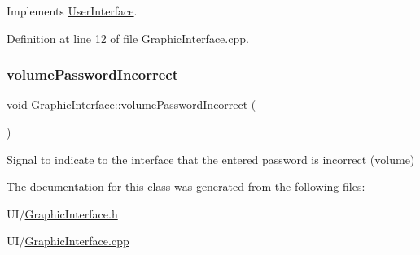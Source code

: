 Implements \hyperlink{class_user_interface_a4f637eb516dc7dc59cbfba43b85a81ff}{User\+Interface}.



Definition at line 12 of file Graphic\+Interface.\+cpp.

\mbox{\label{class_graphic_interface_a0fc2d836e15689e5524ed49fdbe93638}} 
\subsubsection{\texorpdfstring{volume\+Password\+Incorrect}{volumePasswordIncorrect}}
{\footnotesize\ttfamily void Graphic\+Interface\+::volume\+Password\+Incorrect (\begin{DoxyParamCaption}{ }\end{DoxyParamCaption})\hspace{0.3cm}{\ttfamily [signal]}}



Signal to indicate to the interface that the entered password is incorrect (volume) 



The documentation for this class was generated from the following files\+:\begin{DoxyCompactItemize}
\item 
U\+I/\hyperlink{_graphic_interface_8h}{Graphic\+Interface.\+h}\item 
U\+I/\hyperlink{_graphic_interface_8cpp}{Graphic\+Interface.\+cpp}\end{DoxyCompactItemize}
